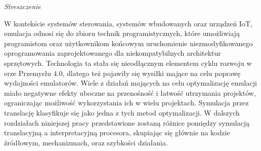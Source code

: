 \documentclass[english,bachelor,a4paper,oneside]{ppfcmthesis}
\begin{document}
\begin{vplace}

\begin{center}
   \huge{\textit{Streszczenie}}
\end{center}

W kontekście systemów sterowania, systemów wbudowanych oraz urządzeń IoT, emulacja odnosi się do zbioru technik
programistycznych, które umożliwiają programistom oraz użytkownikom końcowym uruchomienie niezmodyfikowanego
oprogramowania zaprojektowanego dla niekompatybilnych architektur sprzętowych. Technologia ta stała się nieodłącznym
elementem cyklu rozwoju w erze Przemysłu 4.0, dlatego też pojawiły się wysiłki mające na celu poprawę wydajności
emulatorów. Wiele z działań mających na celu optymalizację emulacji miało negatywne efekty uboczne na przenośność i
łatwość utrzymania projektów, ograniczając możliwość wykorzystania ich w wielu projektach. Symulacja przez translację
klasyfikuje się jako jedna z tych metod optymalizacji. W dalszych rozdziałach niniejszej pracy przedstawione zostaną
różnice pomiędzy symulacją translacyjną a interpretacyjną procesora, skupiając się głównie na kodzie źródłowym,
mechanizmach, oraz szybkości działania.

\end{vplace}

\newpage


\pagestyle{ppfcmthesis}%
\tableofcontents* 
\cleardoublepage %


\mainmatter%









{\raggedright\sloppy\small}


\cleardoublepage\appendix%
\newpage
\if

\begin{appendices}
   
\end{appendices}


\ppcolophon
\end{document}
